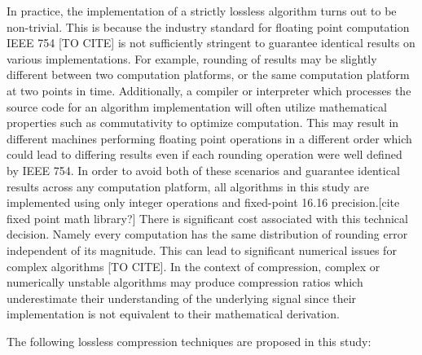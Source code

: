 \documentclass[journal]{IEEEtran}
\begin{document}
In practice, the implementation of a strictly lossless algorithm turns out to be non-trivial. This is because the industry standard for floating point computation IEEE 754 [TO CITE] is not sufficiently stringent to guarantee identical results on various implementations. For example, rounding of results may be slightly different between two computation platforms, or the same computation platform at two points in time. Additionally, a compiler or interpreter which processes the source code for an algorithm implementation will often utilize mathematical properties such as commutativity to optimize computation. This may result in different machines performing floating point operations in a different order which could lead to differing results even if each rounding operation were well defined by IEEE 754. In order to avoid both of these scenarios and guarantee identical results across any computation platform, all algorithms in this study are implemented using only integer operations and fixed-point 16.16 precision.[cite fixed point math library?] There is significant cost associated with this technical decision. Namely every computation has the same distribution of rounding error independent of its magnitude. This can lead to significant numerical issues for complex algorithms [TO CITE]. In the context of compression, complex or numerically unstable algorithms may produce compression ratios which underestimate their understanding of the underlying signal since their implementation is not equivalent to their mathematical derivation.

The following lossless compression techniques are proposed in this study:
\end{document}
